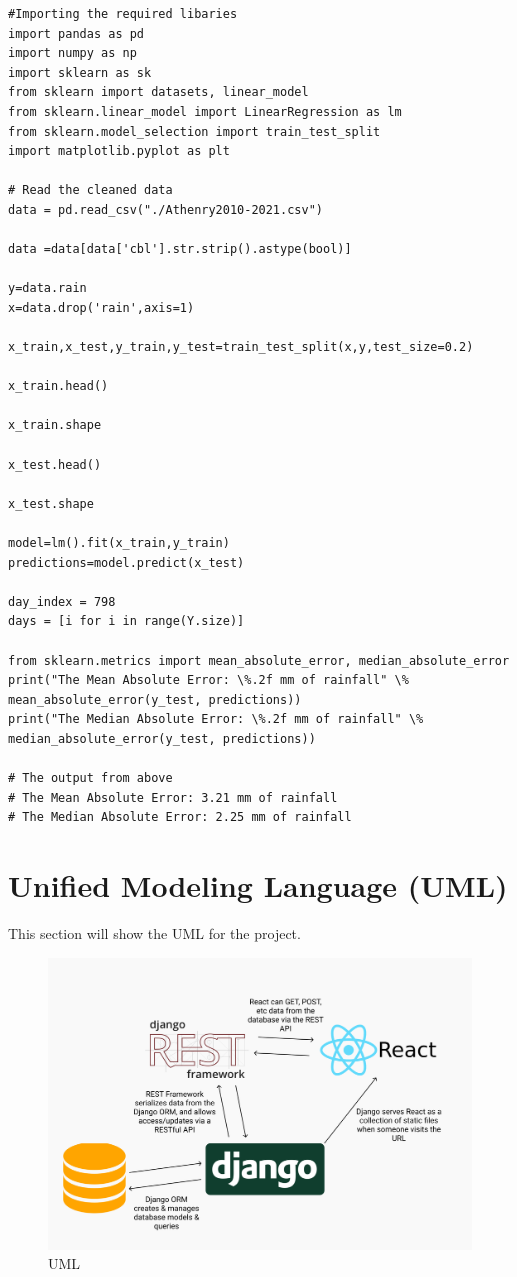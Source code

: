 \begin{verbatim}
#Importing the required libaries
import pandas as pd
import numpy as np
import sklearn as sk
from sklearn import datasets, linear_model
from sklearn.linear_model import LinearRegression as lm
from sklearn.model_selection import train_test_split
import matplotlib.pyplot as plt

# Read the cleaned data
data = pd.read_csv("./Athenry2010-2021.csv")

data =data[data['cbl'].str.strip().astype(bool)]

y=data.rain
x=data.drop('rain',axis=1)

x_train,x_test,y_train,y_test=train_test_split(x,y,test_size=0.2)

x_train.head()

x_train.shape

x_test.head()

x_test.shape

model=lm().fit(x_train,y_train)
predictions=model.predict(x_test)

day_index = 798
days = [i for i in range(Y.size)]

from sklearn.metrics import mean_absolute_error, median_absolute_error
print("The Mean Absolute Error: \%.2f mm of rainfall" \% mean_absolute_error(y_test, predictions))
print("The Median Absolute Error: \%.2f mm of rainfall" \% median_absolute_error(y_test, predictions))

# The output from above
# The Mean Absolute Error: 3.21 mm of rainfall
# The Median Absolute Error: 2.25 mm of rainfall

\end{verbatim}

\section{Unified Modeling Language (UML)}
This section will show the UML for the project.

\begin{figure}[h]
\centering
\includegraphics[scale=0.2]{img/UML.png}
\caption{UML}
\label{UML}
\end{figure}


